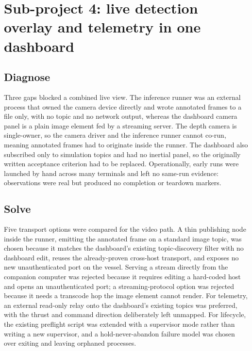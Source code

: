 \documentclass[a4paper,12pt,oneside,openany]{report}
\begin{document}
\section{Sub-project 4: live detection overlay and telemetry in one dashboard}
\label{sec:sub-dashboard}

\subsection{Diagnose}

Three gaps blocked a combined live view. The inference runner was an external process that owned the
camera device directly and wrote annotated frames to a file only, with no topic and no network
output, whereas the dashboard camera panel is a plain image element fed by a streaming server. The
depth camera is single-owner, so the camera driver and the inference runner cannot co-run, meaning
annotated frames had to originate inside the runner. The dashboard also subscribed only to
simulation topics and had no inertial panel, so the originally written acceptance criterion had to
be replaced. Operationally, early runs were launched by hand across many terminals and left no
same-run evidence: observations were real but produced no completion or teardown markers.

\subsection{Solve}

Five transport options were compared for the video path. A thin publishing node inside the runner,
emitting the annotated frame on a standard image topic, was chosen because it matches the
dashboard's existing topic-discovery filter with no dashboard edit, reuses the already-proven
cross-host transport, and exposes no new unauthenticated port on the vessel. Serving a stream
directly from the companion computer was rejected because it requires editing a hard-coded host and
opens an unauthenticated port; a streaming-protocol option was rejected because it needs a transcode
hop the image element cannot render. For telemetry, an external read-only relay onto the dashboard's
existing topics was preferred, with the thrust and command direction deliberately left unmapped. For
lifecycle, the existing preflight script was extended with a supervisor mode rather than writing a
new supervisor, and a hold-never-abandon failure model was chosen over exiting and leaving orphaned
processes.
\end{document}
